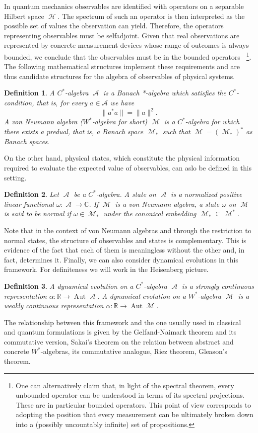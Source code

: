 \documentclass{article}
\DeclareMathOperator{\M}{\mathcal{M}}
\DeclareMathOperator{\A}{\mathcal{A}}
\DeclareMathOperator{\h}{\mathcal{H}}
\DeclareMathOperator{\BH}{\mathcal{B}(\h)}
\DeclareMathOperator{\Aut}{Aut}
\newtheorem{definition}{Definition}[section]
\begin{document}
In quantum mechanics observables are identified with operators on a separable Hilbert space $\h$. The spectrum of such an operator is then interpreted as the possible set of values the observation can yield. Therefore, the operators representing observables must be selfadjoint. Given that real observations are represented by concrete measurement devices whose range of outcomes is always bounded, we conclude that the observables must be in the bounded operators $\BH$\footnote{One can alternatively claim that, in light of the spectral theorem\cite{Hall2013}, every unbounded operator can be understood in terms of its spectral projections. These are in particular bounded operators. This point of view corresponds to adopting the position that every measurement can be ultimately broken down into a (possibly uncountably infinite) set of propositions.}. The following mathematical structures implement these requirements and are thus candidate structures for the algebra of observables of physical systems.    
\begin{definition}
	A $C^*$-algebra $\A$ is a Banach *-algebra which satisfies the $C^*$-condition, that is, for every $a\in\mathcal{A}$ we have
	\begin{equation}
		\|a^*a\|=\|a\|^2.
	\end{equation}
	A von Neumann algebra ($W^*$-algebra for short) $\M$ is a $C^*$-algebra for which there exists a predual, that is, a Banach space $\M_*$ such that $\M=(\M_*)^*$ as Banach spaces.
\end{definition}
On the other hand, physical states, which constitute the physical information required to evaluate the expected value of observables, can aslo be defined in this setting.
\begin{definition}
	Let $\A$ be a $C^*$-algebra. A state on $\A$ is a normalized positive linear functional $\omega:\A\rightarrow\mathbb{C}$. If $\M$ is a von Neumann algebra, a state $\omega$ on $\M$ is said to be normal if $\omega\in\M_*$ under the canonical embedding $\M_*\subseteq\M^*$.
\end{definition}
Note that in the context of von Neumann algebras and through the restriction to normal states, the structure of observables and states is complementary. This is evidence of the fact that each of them is meaningless without the other and, in fact, determines it. Finally, we can also consider dynamical evolutions in this framework. For definiteness we will work in the Heisenberg picture.
\begin{definition}
	A dynamical evolution on a $C^*$-algebra $\A$ is a strongly continuous representation $\alpha:\mathbb{R}\rightarrow\Aut\A$. A dynamical evolution on a $W^*$-algebra $\M$ is a weakly continuous representation $\alpha:\mathbb{R}\rightarrow\Aut\M$.
\end{definition} 
The relationship between this framework and the one usually used in classical and quantum formulations is given by the Gelfand-Naimark theorem and its commutative version\cite{Gelfand1943}, Sakai's theorem on the relation between abstract and concrete $W^*$-algebras\cite{Sakai1956}, its commutative analogue, Riez theorem\cite{Riesz1909, Kukutani1941, Hewitt1975}, Gleason's theorem\cite{Gleason1957}.   
\end{document}
